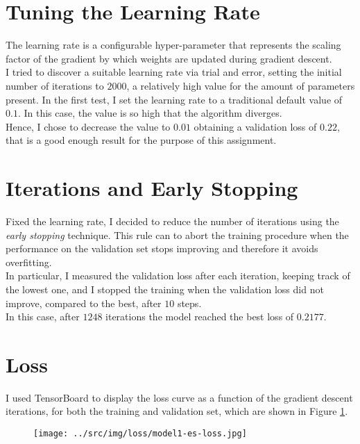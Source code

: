 \documentclass[a4paper,12pt]{article} %
\begin{document}
	\section{Tuning the Learning Rate}
	The learning rate is a configurable hyper-parameter that represents the 
	scaling factor of the gradient by which weights are updated during gradient 
	descent.\\
	I tried to discover a suitable learning rate via trial and error, setting 
	the initial number of iterations to $2000$, a relatively high value for the 
	amount of parameters present.
	In the first test, I set the learning rate to a traditional default value 
	of $0.1$. In this case, the value is so high that the algorithm diverges.\\
	Hence, I chose to decrease the value to $0.01$ obtaining a validation loss 
	of $0.22$, that is a good enough result for the purpose of this assignment.
	
	\section{Iterations and Early Stopping}
	Fixed the learning rate, I decided to reduce the number of iterations using 
	the \textit{early stopping} technique. This rule can to abort the 
	training procedure when the performance on the validation set stops 
	improving and therefore it avoids overfitting. \\
	In particular, I measured the validation loss after each iteration, keeping 
	track of the lowest one, and I stopped the training when the validation 
	loss did not improve, compared to the best, after $10$ steps.\\
	In this case, after $1248$ iterations the model reached the best loss of 
	$0.2177$.
	
	\section{Loss}
	I used {TensorBoard} to display the loss curve as a function of the 
	gradient 
	descent iterations, for both the training and validation set, which are 
	shown in Figure \ref{fig:model1-loss}.
	
	\begin{figure}[htb]
		\centering
		\texttt{[image: ../src/img/loss/model1-es-loss.jpg]}
		\label{fig:model1-loss}
	\end{figure}
	
\end{document}
